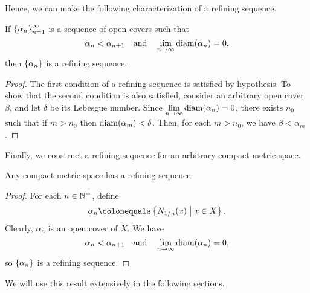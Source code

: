\documentclass[10pt,twoside,draft]{book}
\begin{document}
Hence, we can make the following characterization of a refining sequence.
\begin{corollary}
  If $\left \{ \alpha_n \right \}^{\infty}_{n = 1}$ is a sequence of open covers such that
  \begin{equation*}
    \alpha_n < \alpha_{n+1} 
    \quad\mbox{and}\quad
    \lim\limits_{n \to \infty} \mathrm{diam}(\alpha_n) = 0,
  \end{equation*}
  then $\left \{ \alpha_n \right \}$ is a refining sequence.
  \begin{proof}
    The first condition of a refining sequence is satisfied by hypothesis.
    To show that the second condition is also satisfied, consider an arbitrary open cover $\beta$, and let $\delta$ be its Lebesgue number.
    Since $\lim\limits_{n \to \infty} \mathrm{diam}(\alpha_n) = 0$, there exists $n_0$ such that if $m > n_0$ then $\mathrm{diam}(\alpha_m) < \delta$.
    Then, for each $m > n_0$, we have $\beta < \alpha_m$.
  \end{proof}
\end{corollary}
Finally, we construct a refining sequence for an arbitrary compact metric space.
\begin{corollary}
  Any compact metric space has a refining sequence.
  \begin{proof}
    For each $n \in \mathbb{N}^+$, define
    \begin{equation*}
      \mathcal{\alpha}_n \ceq \setst{\oball{1/n}{x}}{x \in X}.
    \end{equation*}
    Clearly, $\mathcal{\alpha}_n$ is an open cover of $X$.
    We have
    \begin{equation*}
      \mathcal{\alpha}_n < \mathcal{\alpha}_{n+1}
      \quad\mbox{and}\quad
      \lim\limits_{n \to \infty} \mathrm{diam}(\alpha_n) = 0,
    \end{equation*}
    so $\left \{ \alpha_n \right \}$ is a refining sequence.
  \end{proof}
\end{corollary}
We will use this result extensively in the following sections.
\end{document}
